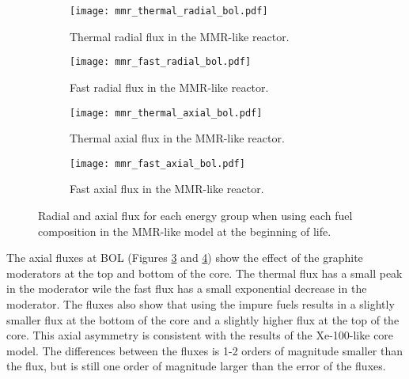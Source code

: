 \begin{figure}[ht]
        \centering
        \begin{subfigure}[b]{0.48\textwidth}
            \centering
            \texttt{[image: mmr\_thermal\_radial\_bol.pdf]}
            \caption{Thermal radial flux in the \gls{MMR}-like reactor.}
            \label{fig:mmr_thermal_radial_bol}
        \end{subfigure}
        \hfill
        \begin{subfigure}[b]{0.48\textwidth}
            \centering
            \texttt{[image: mmr\_fast\_radial\_bol.pdf]}
            \caption{Fast radial flux in the \gls{MMR}-like reactor.}
            \label{fig:mmr_fast_radial_bol}
        \end{subfigure}
        \hfill            
        \begin{subfigure}[b]{0.48\textwidth}
            \centering
            \texttt{[image: mmr\_thermal\_axial\_bol.pdf]}
            \caption{Thermal axial flux in the \gls{MMR}-like reactor. }
            \label{fig:mmr_thermal_axial_bol}
        \end{subfigure}
        \hfill
        \begin{subfigure}[b]{0.48\textwidth}
            \centering
            \texttt{[image: mmr\_fast\_axial\_bol.pdf]}
            \caption{Fast axial flux in the \gls{MMR}-like reactor.}
            \label{fig:mmr_fast_axial_bol}
        \end{subfigure}
        \hfill
        \caption{Radial and axial flux for each energy group when using 
        each fuel composition in the \gls{MMR}-like model at the beginning 
        of life.}
        \label{fig:mmr_bol}
   \end{figure}

The axial fluxes at \gls{BOL} (Figures \ref{fig:mmr_thermal_axial_bol} and 
\ref{fig:mmr_fast_axial_bol}) show the effect of the graphite moderators at 
the top and bottom of the core. The thermal flux has a small peak in the 
moderator wile the fast flux has a small exponential decrease in the 
moderator. The fluxes also show that using the impure fuels results in 
a slightly smaller flux at the bottom of the core and a slightly higher 
flux at the top of the core. This axial asymmetry is consistent with 
the results of the Xe-100-like core model. The differences between the 
fluxes is 1-2 orders of magnitude smaller than the flux, but is 
still one order of magnitude larger than the error of the fluxes.

